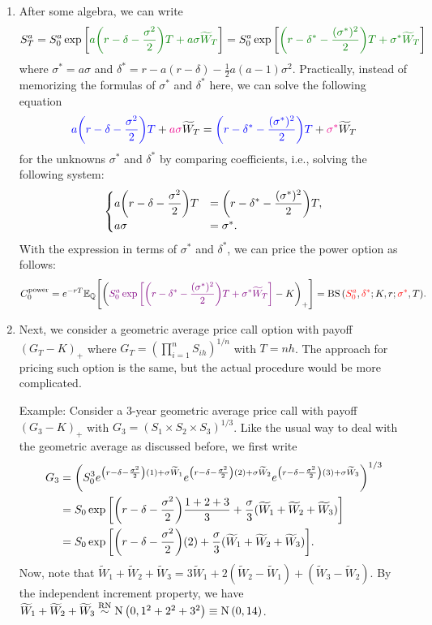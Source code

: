 \begin{enumerate}
\item After some algebra, we can write
\[
S_T^{a}=S_0^{a}\exp\qty[\gc{a\qty(r-\delta-\frac{\sigma^2}{2})T+a\sigma\widetilde{W}_T}]
=S_0^{a}\exp\qty[\gc{\qty(r-\delta^{*}-\frac{(\sigma^{*})^2}{2})T+\sigma^{*}\widetilde{W}_T}]
\]
where \(\sigma^{*}=a\sigma\) and
\(\delta^*=r-a(r-\delta)-\frac{1}{2}a(a-1)\sigma^2\). Practically, instead of
memorizing the formulas of \(\sigma^*\) and \(\delta^*\) here, we can solve the
following equation
\[
{\color{blue}a\qty(r-\delta-\frac{\sigma^2}{2})T}+{\color{magenta}a\sigma}\widetilde{W}_T
={\color{blue}\qty(r-\delta^{*}-\frac{(\sigma^{*})^2}{2})T}+{\color{magenta}\sigma^{*}}\widetilde{W}_T
\]
for the unknowns \(\sigma^*\) and \(\delta^*\) by comparing coefficients, i.e.,
solving the following system:
\[
\begin{cases}
\displaystyle a\qty(r-\delta-\frac{\sigma^2}{2})T&=\displaystyle \qty(r-\delta^{*}-\frac{(\sigma^{*})^2}{2})T,\\
a\sigma&=\sigma^{*}.
\end{cases}
\]
With the expression in terms of \(\sigma^*\) and \(\delta^*\), we can price the
power option as follows:
\[
C_0^{\mathrm{power}}=e^{-rT}\mathbb{E}_{\mathbb{Q}}\qty[\qty({\color{violet}S_0^{a}\exp\qty[\qty(r-\delta^{*}-\frac{(\sigma^{*})^2}{2})T+\sigma^{*}\widetilde{W}_T]}-K)_{+}]
=\operatorname{BS}\qty({\color{red}S_0^a},{\color{red}\delta^*};K,r;{\color{red}\sigma^*},T).
\]

\item \label{it:bs-geo-avg-price} Next, we consider a geometric average price
call option with payoff \((G_T-K)_{+}\) where
\(G_T=(\prod_{i=1}^{n}S_{ih})^{1/n}\) with \(T=nh\). The approach for pricing
such option is the same, but the actual procedure would be more complicated.

Example: Consider a 3-year geometric average price call with payoff
\((G_3-K)_{+}\) with \(G_3=(S_1\times S_2\times S_3)^{1/3}\). Like the usual
way to deal with the geometric average as discussed before, we first write
\begin{align*}
G_3&=\qty(S_0^{3}e^{\qty(r-\delta-\frac{\sigma^2}{2})(1)+\sigma\widetilde{W}_1}
e^{\qty(r-\delta-\frac{\sigma^2}{2})(2)+\sigma\widetilde{W}_2}
e^{\qty(r-\delta-\frac{\sigma^2}{2})(3)+\sigma\widetilde{W}_3}
)^{1/3} \\
&=S_0\exp\qty[\qty(r-\delta-\frac{\sigma^2}{2})\frac{1+2+3}{3}+\frac{\sigma}{3}(\widetilde{W}_1+\widetilde{W}_2+\widetilde{W}_3)] \\
&=S_0\exp\qty[\qty(r-\delta-\frac{\sigma^2}{2})(2)+\frac{\sigma}{3}(\widetilde{W}_1+\widetilde{W}_2+\widetilde{W}_3)].
\end{align*}
Now, note that \(\widetilde{W}_1+\widetilde{W}_2+\widetilde{W}_3
=3\widetilde{W}_1+2(\widetilde{W}_2-\widetilde{W}_1)+(\widetilde{W}_3-\widetilde{W}_2)\).
By the independent increment property, we have
\(\widetilde{W}_1+\widetilde{W}_2+\widetilde{W}_3\overset{\mathrm{RN}}{\sim}\operatorname{N}\qty(0,1^2+2^2+3^2)\equiv\operatorname{N}\qty(0,14)\).


\end{enumerate}
